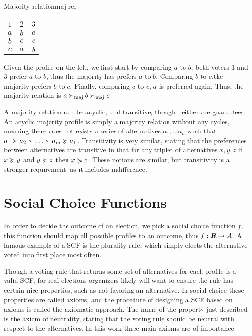 \begin{example}{Majority relation}{maj-rel}
	\begin{minipage}{0.15\linewidth}
		\begin{tabular}{ccc}
			\toprule
			$1$ & $2$ & $3$ \\
			\midrule
			$a$ & $b$ & $a$ \\
			$b$ & $c$ & $c$ \\
			$c$ & $a$ & $b$ \\
			\bottomrule
		\end{tabular}
	\end{minipage}
	\hspace{0.02\linewidth}
	\begin{minipage}{0.78\linewidth}
		Given the profile on the left, we first start by comparing $a$ to $b$, both voters 1 and 3 prefer $a$ to $b$, thus the majority has prefers $a$ to $b$. Comparing $b$ to $c$,the majority prefers $b$ to $c$. Finally, comparing $a$ to $c$, $a$ is preferred again. Thus, the majority relation is $a \succ_{\textnormal{maj}} b \succ_{\textnormal{maj}} c$
	\end{minipage}
\end{example}

A majority relation can be acyclic, and transitive, though neither are
guaranteed. An acyclic majority profile is simply a majority relation without
any cycles, meaning there does not exists a series of alternatives $a_1, \dots
	a_m$ such that $a_1 \pref a_2 \pref \dots \pref a_m  \prefeq a_1$. Transitivity
is very similar, stating that the preferences between alternatives are
transitive in that for any triplet of alternatives $x,y,z$ if $x \succcurlyeq y$ and
$y \succcurlyeq z$ then $x \succcurlyeq z$. These notions are similar, but transitivity
is a stronger requirement, as it includes indifference.


\section{Social Choice Functions} \label{sec:SCF} In order to decide the
outcome of an election, we pick a social choice function $f$, this function
should map all possible profiles to an outcome, thus $f: \boldsymbol{R} \to
	A$. A famous example of a SCF is the plurality rule, which simply
elects the alternative voted into first place most often.

Though a voting rule that returns some set of alternatives for each profile is
a valid SCF, for real elections organizers likely will want to ensure the rule
has certain nice properties, such as not favoring an alternative. In social
choice these properties are called axioms, and the procedure of designing a
SCF based on axioms is called the axiomatic approach. The name of the property
just described is the axiom of neutrality, stating that the voting rule should
be neutral with respect to the alternatives. In this work three main axioms are
of importance.

